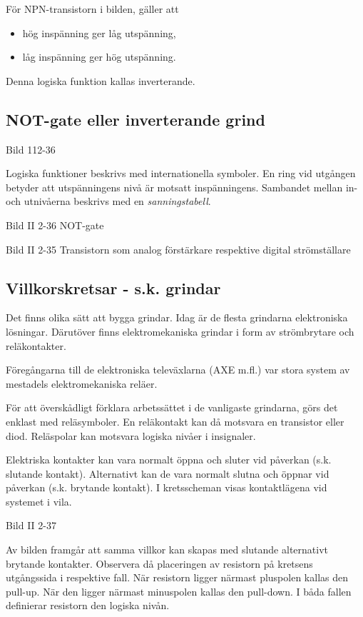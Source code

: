 För NPN-transistorn i bilden, gäller att
\begin{itemize}
\item hög inspänning ger låg utspänning,
\item låg inspänning ger hög utspänning.
\end{itemize}
Denna logiska funktion kallas inverterande.

\subsection{NOT-gate eller inverterande grind}

Bild 112-36

Logiska funktioner beskrivs med internationella symboler. En ring vid utgången
betyder att utspänningens nivå är motsatt inspänningens. Sambandet mellan in-
och utnivåerna beskrivs med en \emph{sanningstabell}.

Bild II 2-36 NOT-gate

Bild II 2-35 Transistorn som analog förstärkare respektive digital strömställare

\subsection{Villkorskretsar - s.k. grindar}

Det finns olika sätt att bygga grindar. Idag är de flesta grindarna elektroniska
lösningar. Därutöver finns elektromekaniska grindar i form av strömbrytare och
reläkontakter.

Föregångarna till de elektroniska televäxlarna (AXE m.fl.) var stora system av
mestadels elektromekaniska reläer.

För att överskådligt förklara arbetssättet i de vanligaste grindarna, görs det
enklast med reläsymboler. En reläkontakt kan då motsvara en transistor eller
diod. Reläspolar kan motsvara logiska nivåer i insignaler.

Elektriska kontakter kan vara normalt öppna och sluter vid påverkan (s.k.
slutande kontakt). Alternativt kan de vara normalt slutna och öppnar vid
påverkan (s.k. brytande kontakt). I kretsscheman visas kontaktlägena vid
systemet i vila.

Bild II 2-37

Av bilden framgår att samma villkor kan skapas med slutande alternativt brytande
kontakter. Observera då placeringen av resistorn på kretsens utgångssida i
respektive fall. När resistorn ligger närmast pluspolen kallas den pull-up. När
den ligger närmast minuspolen kallas den pull-down. I båda fallen definierar
resistorn den logiska nivån.

